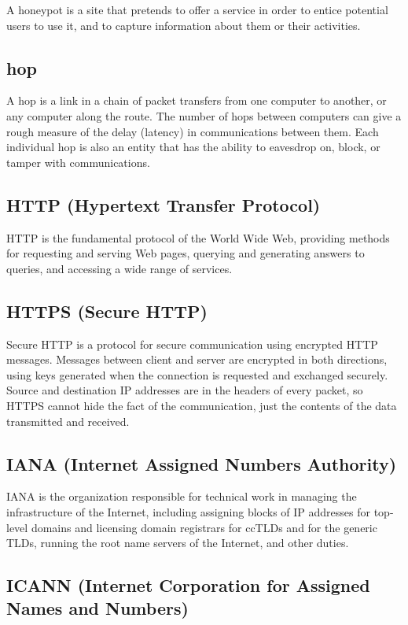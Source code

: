 A honeypot is a site that pretends to offer a service in order to entice
potential users to use it, and to capture information about them or
their activities.

\subsection{hop}

A hop is a link in a chain of packet transfers from one computer to
another, or any computer along the route. The number of hops between
computers can give a rough measure of the delay (latency) in
communications between them. Each individual hop is also an entity that
has the ability to eavesdrop on, block, or tamper with communications.

\subsection{HTTP (Hypertext Transfer Protocol)}

HTTP is the fundamental protocol of the World Wide Web, providing
methods for requesting and serving Web pages, querying and generating
answers to queries, and accessing a wide range of services.

\subsection{HTTPS (Secure HTTP)}

Secure HTTP is a protocol for secure communication using encrypted HTTP
messages. Messages between client and server are encrypted in both
directions, using keys generated when the connection is requested and
exchanged securely. Source and destination IP addresses are in the
headers of every packet, so HTTPS cannot hide the fact of the
communication, just the contents of the data transmitted and received.

\subsection{IANA (Internet Assigned Numbers Authority)}

IANA is the organization responsible for technical work in managing the
infrastructure of the Internet, including assigning blocks of IP
addresses for top-level domains and licensing domain registrars for
ccTLDs and for the generic TLDs, running the root name servers of the
Internet, and other duties.

\subsection{ICANN (Internet Corporation for Assigned Names and Numbers)}

